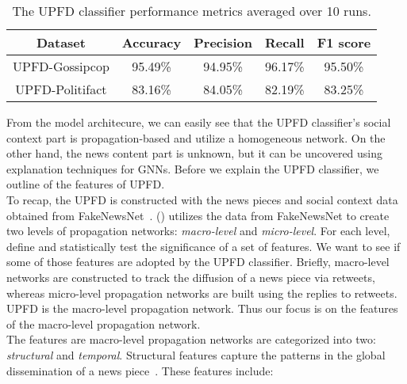 \begin{table}
    \centering
    \begin{tabular}{c | c | c | c | c}
        \textbf{Dataset} & \textbf{Accuracy} & \textbf{Precision} & \textbf{Recall} & \textbf{F1 score} \\
        \hline
        UPFD-Gossipcop   & 95.49\%           & 94.95\%            & 96.17\%         & 95.50\%           \\
        \hline
        UPFD-Politifact  & 83.16\%           & 84.05\%            & 82.19\%         & 83.25\%           \\
    \end{tabular}
    \caption[The UPFD classifier performance metrics averaged over 10 runs.]{The UPFD classifier performance metrics averaged over 10 runs.}
    \label{tab:UPFDClassifier_Results}
\end{table}
From the model architecure, we can easily see that the UPFD classifier's social context part is propagation-based and utilize a homogeneous network. On the other hand, the news content part is unknown, but it can be uncovered using explanation techniques for GNNs. Before we explain the UPFD classifier, we outline of the features of UPFD.\\
To recap, the UPFD is constructed with the news pieces and social context data obtained from FakeNewsNet~\parencite{FakeNewsNet_Shu}. \citeauthor{HierarchicalPropagationNetworksForFND_Shu} (\citeyear{HierarchicalPropagationNetworksForFND_Shu}) utilizes the data from FakeNewsNet to create two levels of propagation networks: \emph{macro-level} and \emph{micro-level}. For each level, ~\citeauthor{HierarchicalPropagationNetworksForFND_Shu} define and statistically test the significance of a set of features. We want to see if some of those features are adopted by the UPFD classifier. Briefly, macro-level networks are constructed to track the diffusion of a news piece via retweets, whereas micro-level propagation networks are built using the replies to retweets. UPFD is the macro-level propagation network. Thus our focus is on the features of the macro-level propagation network.\\
The features are macro-level propagation networks are categorized into two: \emph{structural} and \emph{temporal}. Structural features capture the patterns in the global dissemination of a news piece~\parencite{HierarchicalPropagationNetworksForFND_Shu}. These features include:

